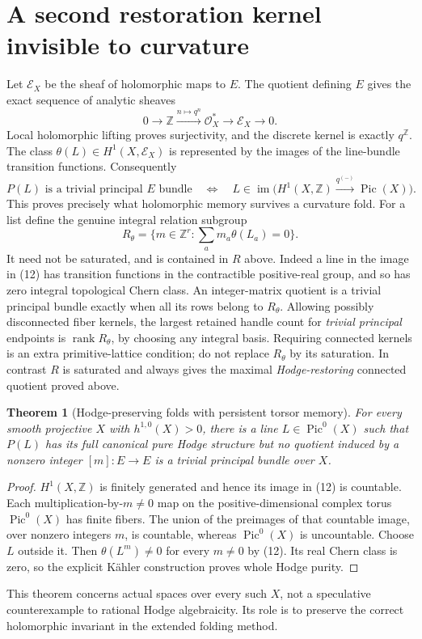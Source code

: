 \documentclass[11pt]{article}
\newtheorem{theorem}{Theorem}
\newcommand{\rk}{\operatorname{rank}}
\newcommand{\im}{\operatorname{im}}
\begin{document}
\section{A second restoration kernel invisible to curvature}
Let $\mathcal E_X$ be the sheaf of holomorphic maps to $E$.
The quotient defining $E$ gives the exact sequence of analytic sheaves
\[
0\longrightarrow\mathbb Z\xrightarrow{n\mapsto q^n}
 \mathcal O_X^*\longrightarrow\mathcal E_X\longrightarrow0.           \tag{11}
\]
Local holomorphic lifting proves surjectivity, and the discrete kernel is
exactly $q^{\mathbb Z}$. The class $\theta(L)\in H^1(X,\mathcal E_X)$
is represented by the images of the line-bundle transition functions.
Consequently
\[
 P(L)\text{ is a trivial principal }E\text{ bundle}
 \quad\Longleftrightarrow\quad
 L\in\im\bigl(H^1(X,\mathbb Z)\xrightarrow{q^{(-)}}\operatorname{Pic}(X)\bigr).
                                                                         \tag{12}
\]
This proves precisely what holomorphic memory survives a curvature fold.
For a list define the genuine integral relation subgroup
\[
 R_\theta=\{m\in\mathbb Z^r:\sum_a m_a\theta(L_a)=0\}.
\]
It need not be saturated, and is contained in $R$ above. Indeed a line in
the image in (12) has transition functions in the contractible positive-real
group, and so has zero integral topological Chern class. An integer-matrix
quotient is a trivial principal bundle exactly when all its rows belong to
$R_\theta$. Allowing possibly disconnected fiber kernels, the largest
retained handle count for \emph{trivial principal} endpoints is
$\rk R_\theta$, by choosing any integral basis. Requiring connected kernels
is an extra primitive-lattice condition; do not replace $R_\theta$ by its
saturation. In contrast $R$ is saturated and always gives the maximal
\emph{Hodge-restoring} connected quotient proved above.

\begin{theorem}[Hodge-preserving folds with persistent torsor memory]
For every smooth projective $X$ with $h^{1,0}(X)>0$, there is a line
$L\in\operatorname{Pic}^0(X)$ such that $P(L)$ has its full canonical pure
Hodge structure but no quotient induced by a nonzero integer $[m]:E\to E$
is a trivial principal bundle over $X$.
\end{theorem}
\begin{proof}
$H^1(X,\mathbb Z)$ is finitely generated and hence its image in (12) is
countable. Each multiplication-by-$m\ne0$ map on the positive-dimensional
complex torus $\operatorname{Pic}^0(X)$ has finite fibers. The union of the
preimages of that countable image, over nonzero integers $m$, is countable,
whereas $\operatorname{Pic}^0(X)$ is uncountable. Choose $L$ outside it.
Then $\theta(L^m)\ne0$ for every $m\ne0$ by (12). Its real Chern class
is zero, so the explicit K\"ahler construction proves whole Hodge purity.
\end{proof}
This theorem concerns actual spaces over every such $X$, not a speculative
counterexample to rational Hodge algebraicity. Its role is to preserve the
correct holomorphic invariant in the extended folding method.
\end{document}
